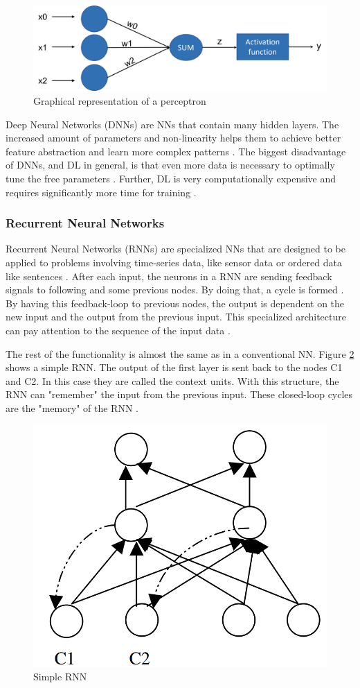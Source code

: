 \begin{figure}[H]
	\centering
	\includegraphics[width=0.8\linewidth]{IMGs/PEC.png}
	\caption{Graphical representation of a perceptron \cite{Ding}}
	\label{fig:PC}
\end{figure}
Deep Neural Networks (DNNs) are NNs that contain many hidden layers. The increased amount of parameters and non-linearity helps them to achieve better feature abstraction and learn more complex patterns \cite{JOOST}.
The biggest disadvantage of DNNs, and DL in general, is that even more data is necessary to optimally tune the free parameters \cite{Thompson}. Further, DL is very computationally expensive and requires significantly more time for training \cite{Fu}. 





\subsubsection*{Recurrent Neural Networks}
Recurrent Neural Networks (RNNs) are specialized NNs that are designed to be applied to problems involving time-series data, like sensor data or ordered data like sentences \cite{Jain}. After each input, the neurons in a RNN are sending feedback signals to following and some previous nodes. By doing that, a cycle is formed \cite{Grossberg}. By having this feedback-loop to previous nodes, the output is dependent on the new input and the output from the previous input. This specialized architecture can pay attention to the sequence of the input data \cite{Jain}.

The rest of the functionality is almost the same as in a conventional NN. Figure \ref{fig:rnn} shows a simple RNN. The output of the first layer is sent back to the nodes C1 and C2. In this case they are called the context units. With this structure, the RNN can "remember" the input from the previous input. These closed-loop cycles are the "memory" of the RNN \cite{Salehinejad}.

\begin{figure}[H]
	\centering
	\includegraphics[width=0.4\linewidth]{IMGs/rnn.png}
	\caption{Simple RNN \cite{Jain}}
	\label{fig:rnn}
\end{figure}

